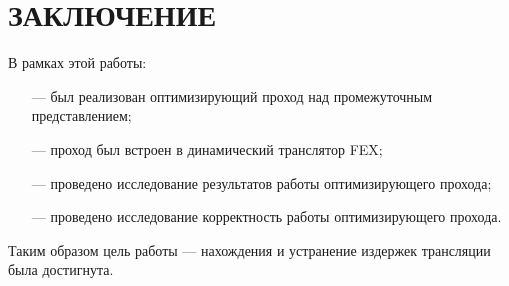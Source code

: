 \section*{ЗАКЛЮЧЕНИЕ}

В рамках этой работы:
\begin{itemize}[leftmargin=1.6\parindent]
	\item [---] был реализован оптимизирующий проход над промежуточным представлением;
	\item [---] проход был встроен в динамический транслятор FEX;
	\item [---] проведено исследование результатов работы оптимизирующего прохода;
	\item [---] проведено исследование корректность работы оптимизирующего прохода.
\end{itemize}

Таким образом цель работы --- нахождения и устранение издержек трансляции была достигнута.

\pagebreak